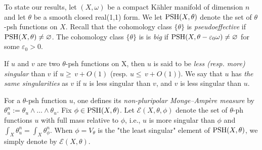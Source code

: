 \documentclass[a4paper]{amsart}
\numberwithin{equation}{section}
\theoremstyle{definition}
\newcommand{\ddc}{dd^c}
\newcommand{\dc}{d^c}
\numberwithin{equation}{section}
\newcommand{\PSH}{{\rm PSH}}
\begin{document}
To state our results, let $(X, \omega)$ be a compact K\"{a}hler manifold of dimension $n$ and let $\theta$ be a smooth closed real(1,1) form. 
We let $\PSH(X, \theta)$ denote the set of $\theta$-psh functions on $X$. Recall that
the cohomology class $\{\theta\}$ is {\em pseudoeffective} if $\PSH(X,\theta)\neq \varnothing$. 
 The cohomology class $\{\theta\}$ is is {\em big} if $\PSH(X,\theta-\varepsilon_0\omega)\neq \varnothing$ for some $\varepsilon_0>0$. 

 If $u$ and $v$ are two $\theta$-psh functions on X, then $u$ is said to be {\em less (resp. more) singular} than $v$ if $u  \geq\, v+O(1)$ (resp. $u  \leq\, v+O(1)$). 
 We say that $u$ has {\em the same singularities} as $v$ if $u$ is less singular than $v$, and $v$ is less singular than $u$. 

For a $\theta$-psh function $u$, one defines its {\em non-pluripolar Monge--Amp\`ere measure} by $\theta_u^n:=\theta_u\wedge\ldots\wedge\theta_u$. Fix $\phi\in \PSH(X,\theta)$.
Let
$\mathcal{E}(X,\theta,\phi)$ denote the set of  $\theta$-ph functions $u$ with full mass relative to $\phi$, i.e., $u$ is more singular than $\phi$ and $\int_X\theta^n_u=\int_X\theta_\phi^n$. When $\phi=V_\theta$ is the "the least singular" element of $\PSH(X,\theta)$, we simply denote by $\mathcal{E}(X,\theta)$.

\end{document}
